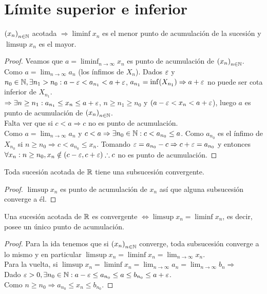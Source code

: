 \section{Límite superior e inferior}

\begin{theorem}
  \({(x_n)}_{n \in \mathbb{N}} \) acotada \(\Rightarrow \liminf x_n\) es el menor punto de acumulación de la sucesión y \(\limsup x_n\) es el mayor.

  \begin{proof}
    Veamos que \(a = \liminf_{n \to \infty} x_n\) es punto de acumulación de \({(x_n)}_{n \in \mathbb{N}} \). \\
    Como \(a = \lim_{n \to \infty} a_n\) (los ínfimos de \(X_n\)). Dados \(\varepsilon \) y \(n_0 \in \mathbb{N}, \exists n_1 > n_0 : a-\varepsilon < a_{n_1} < a+\varepsilon \), \(a_{n_1} = \inf(X_{n_1}) \Rightarrow a + \varepsilon \) no puede ser cota inferior de \(X_{n_1} \). \\
    \(\Rightarrow \exists n \geq n_1 : a_{n_1} \leq x_n \leq a+\varepsilon \), \( n \geq n_1 \geq n_0\) y \((a - \varepsilon < x_n < a + \varepsilon \)), luego \(a\) es punto de acumulación de \({(x_n)}_{n \in \mathbb{N}} \). \\
    Falta ver que si \(c < a \Rightarrow c\) no es punto de acumulación. \\
    Como \(a = \lim_{n \to \infty} a_n\) y \(c < a \Rightarrow \exists n_0 \in \mathbb{N} : c < a_{n_0} \leq a\). Como \(a_{n_0} \) es el ínfimo de \(X_{n_0} \) si \(n \geq n_0 \Rightarrow c < a_{n_0} \leq x_n\). Tomando \(\varepsilon = a_{n_0} - c \Rightarrow c+\varepsilon = a_{n_0} \) y entonces \(\forall x_n: n \geq n_0, x_n \notin (c - \varepsilon, c + \varepsilon) \therefore c\) no es punto de acumulación.
  \end{proof}
\end{theorem}

\begin{theorem}
  Toda sucesión acotada de \(\mathbb{R} \) tiene una subsucesión convergente.
  \begin{proof}
    \(\limsup x_n\) es punto de acumulación de \(x_n\) así que alguna subsucesión converge a él.
  \end{proof}
\end{theorem}

\begin{corollary}
  Una sucesión acotada de \(\mathbb{R} \) es convergente \(\iff \limsup x_n = \liminf x_n\), es decir, posee un único punto de acumulación.
  \begin{proof}
    Para la ida tenemos que si \({(x_n)}_{n \in \mathbb{N}} \) converge, toda subsucesión converge a lo mismo y en particular \(\limsup x_n = \liminf x_n = \lim_{n \to \infty} x_n\). \\
    Para la vuelta, si \(\limsup x_n = \liminf x_n = \lim_{n \to \infty} a_n = \lim_{n \to \infty} b_n \Rightarrow \) \\
    Dado \(\varepsilon > 0, \exists n_0 \in \mathbb{N} : a - \varepsilon \leq a_{n_0} \leq a \leq b_{n_0} \leq a + \varepsilon \). \\
    Como \(n \geq n_0 \Rightarrow a_{n_0} \leq x_n \leq b_{n_0} \).
  \end{proof}
\end{corollary}

